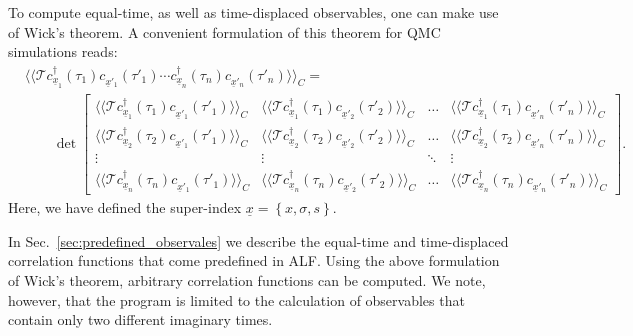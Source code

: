 To compute equal-time, as well as time-displaced observables, one can make use of Wick's theorem. A convenient formulation of this theorem for QMC simulations reads: 
\begin{align}
&\langle \langle 	\mathcal{T}   c^{\dagger}_{\underline x_{1}}(\tau_{1}) c^{\phantom\dagger}_{{\underline x}'_{1}}(\tau'_{1})  
\cdots c^{\dagger}_{\underline x_{n}}(\tau_{n}) c^{\phantom\dagger}_{{\underline x}'_{n}}(\tau'_{n}) 
\rangle \rangle_{C} =
\nonumber \\
&\qquad\det  
\begin{bmatrix}
   \langle \langle   \mathcal{T}   c^{\dagger}_{\underline x_{1}}(\tau_{1}) c^{\phantom\dagger}_{{\underline x}'_{1}}(\tau'_{1})  \rangle \rangle_{C} & 
    \langle \langle  \mathcal{T}   c^{\dagger}_{\underline x_{1}}(\tau_{1}) c^{\phantom\dagger}_{{\underline x}'_{2}}(\tau'_{2})  \rangle \rangle_{C}  & \dots   &   
    \langle \langle   \mathcal{T}   c^{\dagger}_{\underline x_{1}}(\tau_{1}) c^{\phantom\dagger}_{{\underline x}'_{n}}(\tau'_{n})  \rangle \rangle_{C}  \\
    \langle \langle   \mathcal{T}   c^{\dagger}_{\underline x_{2}}(\tau_{2}) c^{\phantom\dagger}_{{\underline x}'_{1}}(\tau'_{1})  \rangle \rangle_{C}  & 
      \langle \langle   \mathcal{T}   c^{\dagger}_{\underline x_{2}}(\tau_{2}) c^{\phantom\dagger}_{{\underline x}'_{2}}(\tau'_{2})  \rangle \rangle_{C}  & \dots  &
       \langle \langle   \mathcal{T}   c^{\dagger}_{\underline x_{2}}(\tau_{2}) c^{\phantom\dagger}_{{\underline x}'_{n}}(\tau'_{n})  \rangle \rangle_{C}   \\
    \vdots & \vdots &  \ddots & \vdots \\
    \langle \langle   \mathcal{T}   c^{\dagger}_{\underline x_{n}}(\tau_{n}) c^{\phantom\dagger}_{{\underline x}'_{1}}(\tau'_{1})  \rangle \rangle_{C}   & 
     \langle \langle   \mathcal{T}   c^{\dagger}_{\underline x_{n}}(\tau_{n}) c^{\phantom\dagger}_{{\underline x}'_{2}}(\tau'_{2})  \rangle \rangle_{C}   & \dots  & 
     \langle \langle   \mathcal{T}   c^{\dagger}_{\underline x_{n}}(\tau_{n}) c^{\phantom\dagger}_{{\underline x}'_{n}}(\tau'_{n})  \rangle \rangle_{C}
 \end{bmatrix}.
\end{align}
Here, we have defined the super-index $\underline{ x} = \left\{   x,\sigma,s \right\}$.

In Sec.~\ref{sec:predefined_observales} we describe the equal-time and time-displaced correlation functions that come predefined in ALF.
Using the  above  formulation  of  Wick's theorem, arbitrary  correlation functions can be computed. We note, however, that the program is limited to the calculation of observables that contain only two different imaginary times.  

